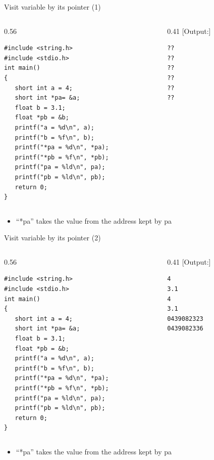 \begin{frame}[fragile]{Visit variable by its pointer (1)}
\vspace{-0.15in}
\begin{columns}
\begin{column}{0.56\linewidth}
\begin{lstlisting}[xleftmargin=0.05\linewidth, linewidth=0.95\linewidth]
#include <string.h>
#include <stdio.h>
int main()
{
   short int a = 4;
   short int *pa= &a;
   float b = 3.1;
   float *pb = &b;
   printf("a = %d\n", a);
   printf("b = %f\n", b);
   printf("*pa = %d\n", *pa);
   printf("*pb = %f\n", *pb);
   printf("pa = %ld\n", pa);
   printf("pb = %ld\n", pb);
   return 0;
}
\end{lstlisting}
\end{column}
\begin{column}{0.41\linewidth}
[Output:]
\begin{lstlisting}
??
??
??
??
??
??
\end{lstlisting}
\end{column}
\end{columns}
\vspace{-0.1in}
\begin{itemize}
	\item {``*pa'' takes the value from the address kept by pa}
\end{itemize}
\end{frame}


\begin{frame}[fragile]{Visit variable by its pointer (2)}
\vspace{-0.15in}
\begin{columns}
\begin{column}{0.56\linewidth}
\begin{lstlisting}[xleftmargin=0.02\linewidth, linewidth=0.98\linewidth]
#include <string.h>
#include <stdio.h>
int main()
{
   short int a = 4;
   short int *pa= &a;
   float b = 3.1;
   float *pb = &b;
   printf("a = %d\n", a);
   printf("b = %f\n", b);
   printf("*pa = %d\n", *pa);
   printf("*pb = %f\n", *pb);
   printf("pa = %ld\n", pa);
   printf("pb = %ld\n", pb);
   return 0;
}
\end{lstlisting}
\end{column}
\begin{column}{0.41\linewidth}
[Output:]
\begin{lstlisting}
4
3.1
4
3.1
0439082323
0439082336
\end{lstlisting}
\end{column}
\end{columns}
\vspace{-0.1in}
\begin{itemize}
	\item {``*pa'' takes the value from the address kept by pa}
\end{itemize}
\end{frame}

